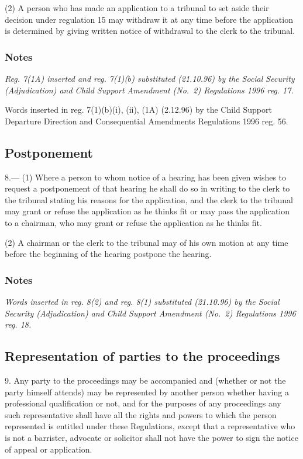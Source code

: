 \documentclass[a4paper]{article}
\newcommand\amendment[1]{\subsubsection*{Notes}{\itshape\frenchspacing\footnotesize #1 \par}}
\begin{document}
(2) A person who has made an application to a tribunal to set aside their decision under regulation 15 may withdraw it at any time before the application is determined by giving written notice of withdrawal to the clerk to the tribunal.

\amendment{
Reg. 7(1A) inserted and reg. 7(1)($b$) substituted (21.10.96) by the Social Security (Adjudication) and Child Support Amendment (No.\ 2) Regulations 1996 reg. 17.

Words inserted in reg. 7(1)(b)(i), (ii), (1A) (2.12.96) by the Child Support Departure Direction and Consequential Amendments Regulations 1996 reg. 56.
}

\subsection[8. Postponement]{Postponement}

8.—%
%
(1) Where a person to whom notice of a hearing has been given wishes to request a postponement of that hearing he shall do so in writing to the clerk to the tribunal stating his reasons for the application, and the clerk to the tribunal may grant or refuse the application as he thinks fit or may pass the application to a chairman, who may grant or refuse the application as he thinks fit.

(2) A chairman 
or the clerk to the tribunal  %
may of his own motion at any time before the beginning of the hearing postpone the hearing.

\amendment{
Words inserted in reg. 8(2) and reg. 8(1) substituted (21.10.96) by the Social Security (Adjudication) and Child Support Amendment (No.\ 2) Regulations 1996 reg. 18.
}

\subsection[9. Representation of parties to the proceedings]{Representation of parties to the proceedings}

9.  Any party to the proceedings may be accompanied and (whether or not the party himself attends) may be represented by another person whether having a professional qualification or not, and for the purposes of any proceedings any such representative shall have all the rights and powers to which the person represented is entitled under these Regulations, except that a representative who is not a barrister, advocate or solicitor shall not have the power to sign the notice of appeal or application.
\end{document}
